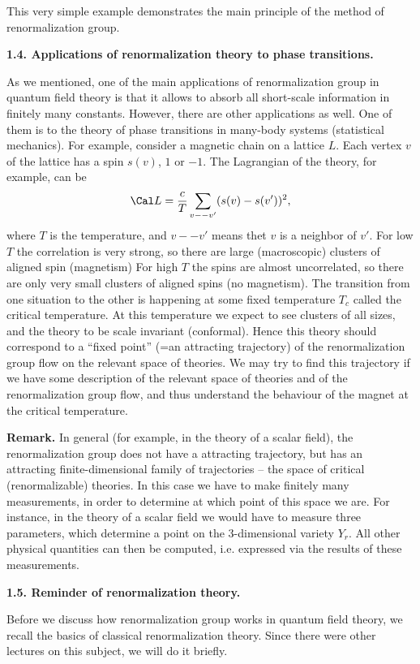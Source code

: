 This very simple example demonstrates the main principle of the method
of renormalization group. 


{\bf 1.4. Applications of renormalization theory to phase transitions.}

As we mentioned, one of the main applications of renormalization group
in quantum field theory is that it allows to absorb all short-scale
information in finitely many constants. However, there are other
applications as well. One of them is to the theory of phase transitions
in many-body systems (statistical mechanics). 
For example, consider a magnetic chain on a lattice $L$. 
Each vertex $v$ of the lattice has a spin $s(v)$, $1$ or $-1$. 
The Lagrangian of the theory, for example, can be 
$$
\Cal L=\frac{c}{T}\sum_{v--v'}(s(v)-s(v'))^2,
$$
where $T$ is the temperature, and $v--v'$ means thet $v$ is a neighbor of
$v'$. 
For low $T$ the correlation is very strong, so there are 
large (macroscopic) clusters of aligned spin (magnetism)
For high $T$ the spins are almost 
uncorrelated, so there are only very small clusters of aligned spins
(no magnetism). The transition from one situation to the other is happening
at some fixed temperature $T_c$ called the critical temperature. 
At this temperature we expect to see clusters of all sizes,
and the theory to be scale invariant (conformal). 
Hence this theory should correspond to a ``fixed point'' 
(=an attracting trajectory) of the renormalization group 
flow on the relevant space of theories. We may try to find this trajectory
if we have some description of the relevant space of theories and of the
renormalization group flow, and thus understand the behaviour of the magnet
at the critical temperature. 

{\bf Remark.} In general (for example, in the 
theory of a scalar field), the renormalization group does not have 
a attracting trajectory, but has an attracting
finite-dimensional family of trajectories
-- the space of critical (renormalizable) theories. In this
case we have to make finitely many measurements, in order to determine at 
which point of this space we are. For instance, in the theory of
a scalar field we would have to measure three parameters,
which determine a point on the 3-dimensional variety $Y_r$.  
All other physical quantities can then be 
computed, i.e. expressed via the results of these measurements.  

{\bf 1.5. Reminder of renormalization theory.}

Before we discuss how renormalization group works in quantum field theory, 
we recall the basics of classical renormalization theory.
Since there were other lectures on this subject, we will do it briefly.

